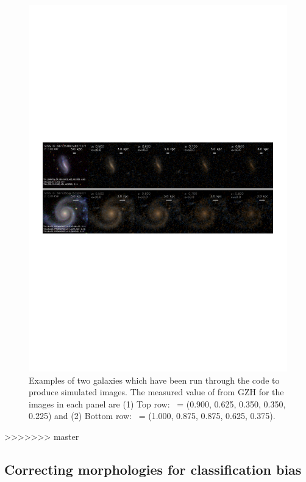 \documentclass[twocolumn]{aastex6}
\begin{document}
\begin{figure}
\center
\includegraphics[width=160mm]{figures/example_ferengi.pdf}
\caption{Examples of two galaxies which have been run through the \ferengi{}
code to produce simulated \hst{} images. The measured value of \ffeatures{}
from GZH for the images in each panel are (1) Top row: \ffeatures~= (0.900,
0.625, 0.350, 0.350, 0.225) and (2) Bottom row: \ffeatures~= (1.000, 0.875,
0.875, 0.625, 0.375). \label{fig:exampleFERENGI}}
\end{figure}
>>>>>>> master

\subsection{Correcting morphologies for classification bias}\label{ssec:zeta}
\end{document}

